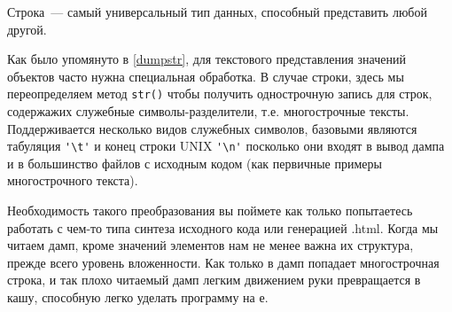 \label{string}

Строка\ --- самый универсальный тип данных, способный представить любой другой.


\noindent
Как было упомянуто в \ref{dumpstr}, для текстового представления значений
объектов часто нужна специальная обработка. В случае строки, здесь мы
переопределяем метод \verb|str()| чтобы получить однострочную запись для строк,
содержажих служебные символы-разделители, т.е. многострочные тексты.
Поддерживается несколько видов служебных символов, базовыми являются табуляция
\verb|'\t'| и конец строки UNIX \verb|'\n'| посколько они входят в вывод дампа и
в большинство файлов с исходным кодом (как первичные примеры многострочного
текста).

Необходимость такого преобразования вы поймете как только попытаетесь работать с
чем-то типа синтеза исходного кода или генерацией .html. Когда мы читаем дамп,
кроме значений элементов нам не менее важна их структура, прежде всего уровень
вложенности. Как только в дамп попадает многострочная строка, и так плохо
читаемый дамп легким движением руки превращается в кашу, способную легко уделать
программу на \lisp е.
